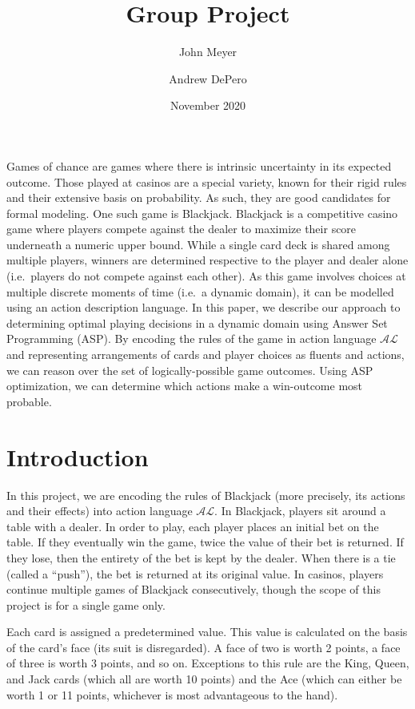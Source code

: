 \documentclass{article}
\title{Group Project}
\author{
    John Meyer
    \and
    Andrew DePero
}
\date{November 2020}
\begin{document}
\maketitle

\noindent
Games of chance are games where there is intrinsic uncertainty in its expected outcome.
Those played at casinos are a special variety, known for their rigid rules and their extensive basis on probability.
As such, they are good candidates for formal modeling.
One such game is Blackjack.
Blackjack is a competitive casino game where players compete against the dealer to maximize their score underneath a numeric upper bound.
While a single card deck is shared among multiple players, winners are determined respective to the player and dealer alone (i.e.~players do not compete against each other).
As this game involves choices at multiple discrete moments of time (i.e.~a dynamic domain), it can be modelled using an action description language.
In this paper, we describe our approach to determining optimal playing decisions in a dynamic domain using Answer Set Programming (ASP).
By encoding the rules of the game in action language $\mathcal{AL}$ and representing arrangements of cards and player choices as fluents and actions, we can reason over the set of logically-possible game outcomes.
Using ASP optimization, we can determine which actions make a win-outcome most probable.

\section{Introduction}

In this project, we are encoding the rules of Blackjack (more precisely, its actions and their effects) into action language $\mathcal{AL}$.
In Blackjack, players sit around a table with a dealer.
In order to play, each player places an initial bet on the table.
If they eventually win the game, twice the value of their bet is returned.
If they lose, then the entirety of the bet is kept by the dealer.
When there is a tie (called a ``push''), the bet is returned at its original value.
In casinos, players continue multiple games of Blackjack consecutively, though the scope of this project is for a single game only.

Each card is assigned a predetermined value.
This value is calculated on the basis of the card's face (its suit is disregarded).
A face of two is worth 2 points, a face of three is worth 3 points, and so on.
Exceptions to this rule are the King, Queen, and Jack cards (which all are worth 10 points) and the Ace (which can either be worth 1 or 11 points, whichever is most advantageous to the hand).
\end{document}
